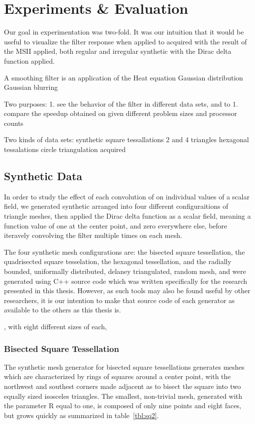 \chapter{Experiments \& Evaluation}
Our goal in experimentation was two-fold. It was our intuition that it would be useful to visualize the filter response when applied to acquired \tdd{} with the result of the MSII applied, both regular and irregular synthetic \tdd{} with the Dirac delta function applied.

A smoothing filter is an application of the Heat equation 
Gaussian distribution
Gaussian blurring


Two purposes:
	1. see the behavior of the filter in different data sets, and to
	1. compare the speedup obtained on given different problem sizes and processor counts

Two kinds of data sets:
	synthetic
		square tessallations 2 and 4 triangles
		hexagonal tessalations
		circle triangulation
	acquired


%
%
%
%
%
%
\section{Synthetic Data}
In order to study the effect of each convolution of  on individual values of a scalar field, we generated synthetic \tdd{} arranged into four different configuraitions of triangle meshes, then applied the Dirac delta function as a scalar field, meaning a function value of one at the center point, and zero everywhere else, before iteravely convolving the filter multiple times on each mesh.

The four synthetic mesh configurations are: the bisected square tessellation, the quadrisected square tesselation, the hexagonal tessellation, and the radially bounded, uniformally distributed, delaney triangulated, random mesh, and were generated using C++ source code which was written specifically for the research presented in this thesis. However, as such tools may also be found useful by other researchers, it is our intention to make that source code of each generator as available to the others as this thesis is.


, with eight different sizes of each,
%
%
%
%
\subsection{Bisected Square Tessellation}
The synthetic mesh generator for bisected square tessellations generates meshes which are characterized by rings of squares around a center point, with the northwest and southest corners made adjacent as to bisect the square into two equally sized isosceles triangles. The smallest, non-trivial mesh, generated with the parameter R equal to one, is composed of only nine points and eight faces, but grows quickly as summarized in table~\ref{tbl:sq2}.

